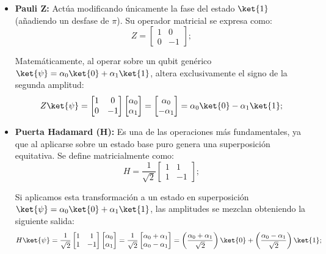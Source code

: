 \begin{itemize}
    \item \textbf{Pauli Z:} Actúa modificando únicamente la fase del estado $\ket{1}$ (añadiendo un desfase de $\pi$). Su operador matricial se expresa como:
          \[
              Z = \begin{bmatrix}
                  1 & 0  \\
                  0 & -1
              \end{bmatrix};
          \]

          Matemáticamente, al operar sobre un qubit genérico $\ket{\psi} = \alpha_0\ket{0} + \alpha_1\ket{1}$, altera exclusivamente el signo de la segunda amplitud:
          \[
              Z\ket{\psi} = \begin{bmatrix} 1 & 0 \\ 0 & -1 \end{bmatrix} \begin{bmatrix} \alpha_0 \\ \alpha_1 \end{bmatrix} = \begin{bmatrix} \alpha_0 \\ -\alpha_1 \end{bmatrix} = \alpha_0\ket{0} - \alpha_1\ket{1};
          \]

    \item \textbf{Puerta Hadamard (H):} Es una de las operaciones más fundamentales, ya que al aplicarse sobre un estado base puro genera una superposición equitativa. Se define matricialmente como:
          \[
              H = \frac{1}{\sqrt{2}}\begin{bmatrix}
                  1 & 1  \\
                  1 & -1
              \end{bmatrix};
          \]

          Si aplicamos esta transformación a un estado en superposición $\ket{\psi} = \alpha_0\ket{0} + \alpha_1\ket{1}$, las amplitudes se mezclan obteniendo la siguiente salida:
          \[
              H\ket{\psi} = \frac{1}{\sqrt{2}}\begin{bmatrix} 1 & 1 \\ 1 & -1 \end{bmatrix} \begin{bmatrix} \alpha_0 \\ \alpha_1 \end{bmatrix} = \frac{1}{\sqrt{2}}\begin{bmatrix} \alpha_0 + \alpha_1 \\ \alpha_0 - \alpha_1 \end{bmatrix} = \left(\frac{\alpha_0 + \alpha_1}{\sqrt{2}}\right)\ket{0} + \left(\frac{\alpha_0 - \alpha_1}{\sqrt{2}}\right)\ket{1};
          \]
\end{itemize}